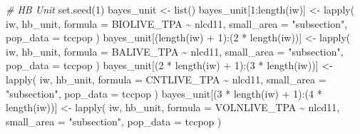 \documentclass[12pt,twoside]{reedthesis}
\newenvironment{Shaded}{\begin{snugshade}}{\end{snugshade}}
\newcommand{\AttributeTok}[1]{\textcolor[rgb]{0.77,0.63,0.00}{#1}}
\newcommand{\CommentTok}[1]{\textcolor[rgb]{0.56,0.35,0.01}{\textit{#1}}}
\newcommand{\DecValTok}[1]{\textcolor[rgb]{0.00,0.00,0.81}{#1}}
\newcommand{\FunctionTok}[1]{\textcolor[rgb]{0.00,0.00,0.00}{#1}}
\newcommand{\NormalTok}[1]{#1}
\newcommand{\OtherTok}[1]{\textcolor[rgb]{0.56,0.35,0.01}{#1}}
\newcommand{\SpecialCharTok}[1]{\textcolor[rgb]{0.00,0.00,0.00}{#1}}
\newcommand{\StringTok}[1]{\textcolor[rgb]{0.31,0.60,0.02}{#1}}
\begin{document}
\begin{Shaded}
\begin{Highlighting}[]
\CommentTok{\# HB Unit}
\FunctionTok{set.seed}\NormalTok{(}\DecValTok{1}\NormalTok{)}
\NormalTok{bayes\_unit }\OtherTok{\textless{}{-}} \FunctionTok{list}\NormalTok{()}
\NormalTok{bayes\_unit[}\DecValTok{1}\SpecialCharTok{:}\FunctionTok{length}\NormalTok{(iw)] }\OtherTok{\textless{}{-}} \FunctionTok{lapply}\NormalTok{(}
\NormalTok{  iw,}
\NormalTok{  hb\_unit,}
  \AttributeTok{formula =}\NormalTok{ BIOLIVE\_TPA }\SpecialCharTok{\textasciitilde{}}\NormalTok{ nlcd11,}
  \AttributeTok{small\_area =} \StringTok{"subsection"}\NormalTok{,}
  \AttributeTok{pop\_data =}\NormalTok{ tccpop}
\NormalTok{)}
\NormalTok{bayes\_unit[(}\FunctionTok{length}\NormalTok{(iw) }\SpecialCharTok{+} \DecValTok{1}\NormalTok{)}\SpecialCharTok{:}\NormalTok{(}\DecValTok{2} \SpecialCharTok{*} \FunctionTok{length}\NormalTok{(iw))] }\OtherTok{\textless{}{-}}
  \FunctionTok{lapply}\NormalTok{(}
\NormalTok{    iw,}
\NormalTok{    hb\_unit,}
    \AttributeTok{formula =}\NormalTok{ BALIVE\_TPA }\SpecialCharTok{\textasciitilde{}}\NormalTok{ nlcd11,}
    \AttributeTok{small\_area =} \StringTok{"subsection"}\NormalTok{,}
    \AttributeTok{pop\_data =}\NormalTok{ tccpop}
\NormalTok{  )}
\NormalTok{bayes\_unit[(}\DecValTok{2} \SpecialCharTok{*} \FunctionTok{length}\NormalTok{(iw) }\SpecialCharTok{+} \DecValTok{1}\NormalTok{)}\SpecialCharTok{:}\NormalTok{(}\DecValTok{3} \SpecialCharTok{*} \FunctionTok{length}\NormalTok{(iw))] }\OtherTok{\textless{}{-}}
  \FunctionTok{lapply}\NormalTok{(}
\NormalTok{    iw,}
\NormalTok{    hb\_unit,}
    \AttributeTok{formula =}\NormalTok{ CNTLIVE\_TPA }\SpecialCharTok{\textasciitilde{}}\NormalTok{ nlcd11,}
    \AttributeTok{small\_area =} \StringTok{"subsection"}\NormalTok{,}
    \AttributeTok{pop\_data =}\NormalTok{ tccpop}
\NormalTok{  )}
\NormalTok{bayes\_unit[(}\DecValTok{3} \SpecialCharTok{*} \FunctionTok{length}\NormalTok{(iw) }\SpecialCharTok{+} \DecValTok{1}\NormalTok{)}\SpecialCharTok{:}\NormalTok{(}\DecValTok{4} \SpecialCharTok{*} \FunctionTok{length}\NormalTok{(iw))] }\OtherTok{\textless{}{-}}
  \FunctionTok{lapply}\NormalTok{(}
\NormalTok{    iw,}
\NormalTok{    hb\_unit,}
    \AttributeTok{formula =}\NormalTok{ VOLNLIVE\_TPA }\SpecialCharTok{\textasciitilde{}}\NormalTok{ nlcd11,}
    \AttributeTok{small\_area =} \StringTok{"subsection"}\NormalTok{,}
    \AttributeTok{pop\_data =}\NormalTok{ tccpop}
\NormalTok{  )}


\end{Highlighting}
\end{Shaded}
\end{document}
